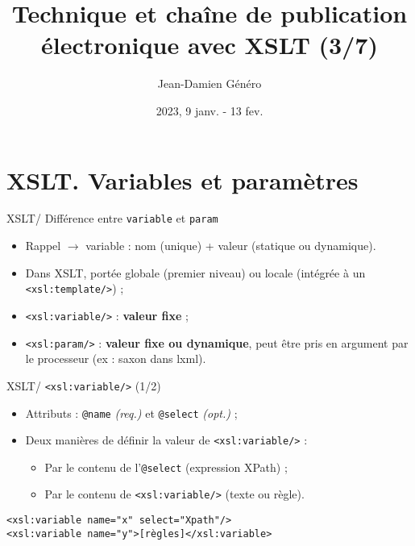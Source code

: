 \documentclass{beamer}
\title{Technique et chaîne de publication électronique avec XSLT (3/7)}
\date{2023, 9 janv. - 13 fev.}
\author{Jean-Damien Généro}
\institute{École nationale des chartes -- M2 TNAH}
\begin{document}
    \maketitle
    
    \section{XSLT. Variables et paramètres}

    \begin{frame}{XSLT/ Différence entre \texttt{variable} et \texttt{param}}
        \Large
        \begin{itemize}
            \item Rappel $\rightarrow$ variable : nom (unique) + valeur (statique ou dynamique).
            \bigskip
            \item Dans XSLT, portée globale (premier niveau) ou locale (intégrée à un \texttt{<xsl:template/>}) ;
            \bigskip
            \item \texttt{<xsl:variable/>} : \textbf{valeur fixe} ;
            \bigskip
            \item \texttt{<xsl:param/>} : \textbf{valeur fixe ou dynamique}, peut être pris en argument par le processeur (ex : saxon dans lxml).
        \end{itemize}
    \end{frame}

    \begin{frame}[fragile]{XSLT/ \texttt{<xsl:variable/>} (1/2)}
        \Large
        \begin{itemize}
            \item Attributs : \texttt{@name} \textit{(req.)} et \texttt{@select} \textit{(opt.)} ;
            \bigskip
            \item Deux manières de définir la valeur de \texttt{<xsl:variable/>} :
            \begin{itemize}
            \Large
                \item Par le contenu de l'\texttt{@select} (expression XPath) ;
                \item Par le contenu de \texttt{<xsl:variable/>} (texte ou règle).
            \end{itemize}
        \end{itemize}
        \normalsize
        \begin{verbatim}
<xsl:variable name="x" select="Xpath"/>
<xsl:variable name="y">[règles]</xsl:variable>
        \end{verbatim}
    \end{frame}
\end{document}
